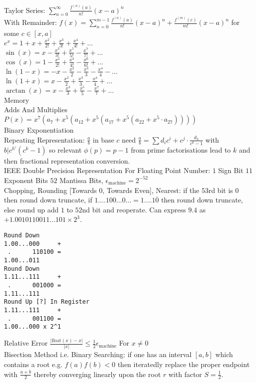 \small
\twocolumn

Taylor Series: $\sum_{n=0}^{\infty} \frac{f^{(n)}(a)}{n!} (x-a)^n$ \\
With Remainder: $f(x)=\sum_{n=0}^{m-1} \frac{f^{(n)}(a)}{n!} (x-a)^n + \frac{f^{(m)}(c)}{m!} (x-a)^n$ for some $c \in [x,a]$ \\
$e^x = 1+x+\frac{x^2}{2!}+\frac{x^3}{3!}+\frac{x^4}{4!}+\dots$ \\
$\sin(x) = x-\frac{x^3}{3!}+\frac{x^5}{5!}-\frac{x^7}{7!}+\dots$ \\
$\cos(x) = 1-\frac{x^2}{2!}+\frac{x^4}{4!}-\frac{x^6}{6!}+\dots$ \\
$\ln (1-x) = -x-\frac{x^2}{2}-\frac{x^3}{3}-\frac{x^4}{4}-\dots$ \\
$\ln (1+x) = x-\frac{x^2}{2}+\frac{x^3}{3}-\frac{x^4}{4}+\dots$ \\
$\arctan (x) = x-\frac{x^3}{3}+\frac{x^5}{5}-\frac{x^7}{7}+\dots$ \\
Memory \\
Adds And Multiplies \\
$P(x)=x^7(a_7+x^5(a_{12}+x^5(a_{17}+x^5(a_{22}+x^5 \cdot a_{27}))))$ \\
Binary Exponentiation \\
Repeating Representation: $\frac{a}{b}$ in base $c$ need $\frac{a}{b}=\sum d_i c^i + c^j \cdot \frac{d_h}{c^k-1}$ with $b | c^{h'}(c^k-1)$ so relevant $\phi (p) = p-1$ from prime factorisations lead to $k$ and then fractional representation conversion. \\
IEEE Double Precision Representation For Floating Point Number: $1$ Sign Bit $11$ Exponent Bits $52$ Mantissa Bits, $\epsilon_{\text{machine}} = 2^{-52}$ \\
Chopping, Rounding [Towards 0, Towards Even], Nearest: if the $53$rd bit is $0$ then round down truncate, if $1.\dots 100 \dots 0 \dots = 1.\dots 1 \overline{0}$ then round down truncate, else round up add $1$ to $52$nd bit and reoperate. Can express $9.4$ as $+1.0010110011 \dots 101 \times 2^3$. \\
\begin{verbatim}
Round Down
1.00...000     +
 .      110100 =
1.00...011
Round Down
1.11...111     +
 .      001000 =
1.11...111
Round Up [?] In Register
1.11...111     +
 .      001100 =
1.00...000 x 2^1
\end{verbatim}
Relative Error $\frac{|\text{float}(x)-x|}{|x|} \le \frac{1}{2} \epsilon_{\text{machine}}$ For $x \neq 0$ \\
Bisection Method i.e. Binary Searching: if one has an interval $[a,b]$ which contains a root e.g. $f(a)f(b)<0$ then iteratedly replace the proper endpoint with $\frac{a+b}{2}$ thereby converging linearly upon the root $r$ with factor $S = \frac{1}{2}$. \\

